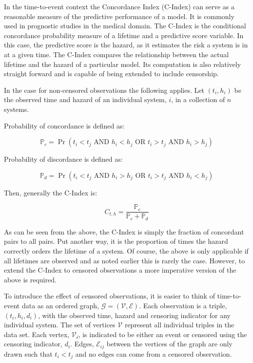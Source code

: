 In the time-to-event context the Concordance Index (C-Index) can serve as a reasonable measure of the predictive performance of a model. It is commonly used in prognostic studies in the medical domain\cite{Tripepi2010}. The C-Index is the conditional concordance probability measure of a lifetime and a predictive score variable\cite{Kang2015}. In this case, the predictive score is the hazard, as it estimates the risk a system is in at a given time. The C-Index compares the relationship between the actual lifetime and the hazard of a particular model. Its computation is also relatively straight forward and is capable of being extended to include censorship.

In the case for non-censored observations the following applies. Let $(t_i, h_i)$ be the observed time and hazard of an individual system, $i$, in a collection of $n$ systems.

Probability of concordance is defined as:

$$\mathbb{P}_c  = \Pr(t_i  < t_j \text{ AND } h_i < h_j \text{ OR } t_i  > t_j \text{ AND } h_i > h_j)  $$

Probability of discordance is defined as:

$$\mathbb{P}_d  = \Pr(t_i  < t_j \text{ AND } h_i > h_j \text{ OR } t_i  > t_j \text{ AND } h_i < h_j)  $$

Then, generally the C-Index is:

$$ C_{t, h} = \frac{\mathbb{P}_c}{\mathbb{P}_c + \mathbb{P}_d} $$

As can be seen from the above, the C-Index is simply the fraction of concordant pairs to all pairs. Put another way, it is the proportion of times the hazard correctly orders the lifetime of a system. Of course, the above is only applicable if all lifetimes are observed and as noted earlier this is rarely the case. However, to extend the C-Index to censored observations a more imperative version of the above is required. 


To introduce the effect of censored observations, it is easier to think of time-to-event data as an ordered graph, $\mathcal{G} = (\mathcal{V}, \mathcal{E})$\cite{Steck2008}. Each observation is a triple, $(t_i, h_i, d_i)$, with the observed time, hazard and censoring indicator for any individual system. The set of vertices $\mathcal{V}$ represent all individual triples in the data set. Each vertex, $\mathcal{V_i}$, is indicated to be either an event or censored using the censoring indicator, $d_i$. Edges, $\mathcal{E}_{ij}$ between the vertices of the graph are only drawn such that $t_i < t_j$ and no edges can come from a censored observation.

